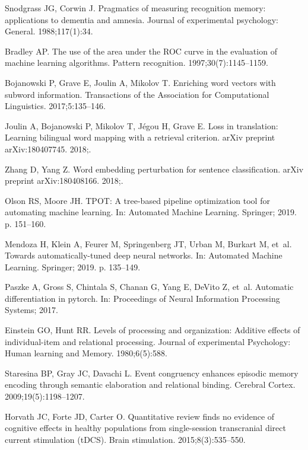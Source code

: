 \documentclass[10pt,letterpaper]{article}
\begin{document}
\begin{thebibliography}{10}
Snodgrass JG, Corwin J.
\newblock Pragmatics of measuring recognition memory: applications to dementia
  and amnesia.
\newblock Journal of experimental psychology: General. 1988;117(1):34.

Bradley AP.
\newblock The use of the area under the ROC curve in the evaluation of machine
  learning algorithms.
\newblock Pattern recognition. 1997;30(7):1145--1159.

Bojanowski P, Grave E, Joulin A, Mikolov T.
\newblock Enriching word vectors with subword information.
\newblock Transactions of the Association for Computational Linguistics.
  2017;5:135--146.

Joulin A, Bojanowski P, Mikolov T, J{\'e}gou H, Grave E.
\newblock Loss in translation: Learning bilingual word mapping with a retrieval
  criterion.
\newblock arXiv preprint arXiv:180407745. 2018;.

Zhang D, Yang Z.
\newblock Word embedding perturbation for sentence classification.
\newblock arXiv preprint arXiv:180408166. 2018;.

Olson RS, Moore JH.
\newblock TPOT: A tree-based pipeline optimization tool for automating machine
  learning.
\newblock In: Automated Machine Learning. Springer; 2019. p. 151--160.

Mendoza H, Klein A, Feurer M, Springenberg JT, Urban M, Burkart M, et~al.
\newblock Towards automatically-tuned deep neural networks.
\newblock In: Automated Machine Learning. Springer; 2019. p. 135--149.

Paszke A, Gross S, Chintala S, Chanan G, Yang E, DeVito Z, et~al.
\newblock Automatic differentiation in pytorch.
\newblock In: Proceedings of Neural Information Processing Systems; 2017.

Einstein GO, Hunt RR.
\newblock Levels of processing and organization: Additive effects of
  individual-item and relational processing.
\newblock Journal of experimental Psychology: Human learning and Memory.
  1980;6(5):588.

Staresina BP, Gray JC, Davachi L.
\newblock Event congruency enhances episodic memory encoding through semantic
  elaboration and relational binding.
\newblock Cerebral Cortex. 2009;19(5):1198--1207.

Horvath JC, Forte JD, Carter O.
\newblock Quantitative review finds no evidence of cognitive effects in healthy
  populations from single-session transcranial direct current stimulation
  (tDCS).
\newblock Brain stimulation. 2015;8(3):535--550.


\end{thebibliography}
\end{document}
